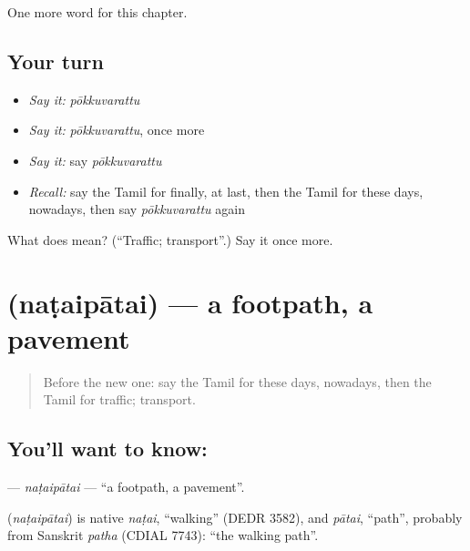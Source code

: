 \begin{grammarlens}[title={What you've built}]
One more word for this chapter.
\end{grammarlens}

\subsection*{Your turn}
\begin{itemize}
\raggedright
  \item \emph{Say it:} \emph{pōkkuvarattu}
  \item \emph{Say it:} \emph{pōkkuvarattu}, once more
  \item \emph{Say it:} say \emph{pōkkuvarattu}
  \item \emph{Recall:} say the Tamil for finally, at last, then the Tamil for these days, nowadays, then say \emph{pōkkuvarattu} again
\end{itemize}

\begin{tcolorbox}[breakable,colback=teal!4,colframe=teal!35!black,title={Before you move on}]
What does  mean? (\textquotedblleft{}Traffic; transport\textquotedblright{}.) Say it once more.
\end{tcolorbox}
\section[\texorpdfstring{\ta{நடைபாதை} (naṭaipātai)}{நடைபாதை (naṭaipātai)}]{ (naṭaipātai) — a footpath, a pavement}

\label{lesson:TA-C263-nataipatai}



\begin{quote}
Before the new one: say the Tamil for these days, nowadays, then the Tamil for traffic; transport.
\end{quote}

\subsection*{You'll want to know: }
\textbf{} — \emph{naṭaipātai} — \textquotedblleft{}a footpath, a pavement\textquotedblright{}.

\begin{cousinweb}
\textbf{} (\emph{naṭaipātai}) is native \emph{naṭai}, \textquotedblleft{}walking\textquotedblright{} (DEDR 3582), and \emph{pātai}, \textquotedblleft{}path\textquotedblright{}, probably from Sanskrit \emph{patha} (CDIAL 7743): \textquotedblleft{}the walking path\textquotedblright{}.
\end{cousinweb}

